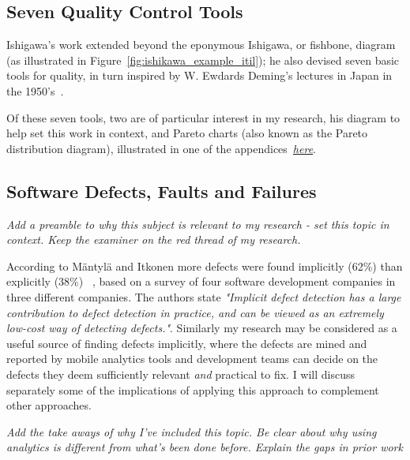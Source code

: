 \subsection{Seven Quality Control Tools}
Ishigawa's work extended beyond the eponymous Ishigawa, or fishbone, diagram (as illustrated in Figure~\ref{fig:ishikawa_example_itil}); he also devised seven basic tools for quality, in turn inspired by W. Ewdards Deming's lectures in Japan in the 1950's~\cite{7_basic_quality_tools_with_R}.

Of these seven tools, two are of particular interest in my research, his diagram to help set this work in context, and Pareto charts (also known as the Pareto distribution diagram), illustrated in one of the appendices~\hyperlink{pareto.diagrams.in.r}{\emph{here}}.


\hypertarget{defects.faults.failures}{}
\subsection{Software Defects, Faults and Failures}
\emph{Add a preamble to why this subject is relevant to my research - set this topic in context. Keep the examiner on the red thread of my research.}


According to Mäntylä and Itkonen more defects were found implicitly (62\%) than explicitly (38\%) ~\cite{mantyla2014_how_are_software_defects_found}, based on a survey of four software development companies in three different companies. The authors state \emph{"Implicit defect detection has a large contribution to defect detection in practice, and can be viewed as
an extremely low-cost way of detecting defects."}. Similarly my research may be considered as a useful source of finding defects implicitly, where the defects are mined and reported by mobile analytics tools and development teams can decide on the defects they deem sufficiently relevant \emph{and} practical to fix. I will discuss separately some of the implications of applying this approach to complement other approaches.

\emph{Add the take aways of why I've included this topic. Be clear about why using analytics is different from what's been done before. Explain the gaps in prior work}

~\hypertarget{software.reliability}{}
